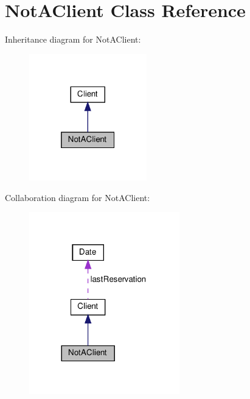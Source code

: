 \hypertarget{class_not_a_client}{}\section{Not\+A\+Client Class Reference}
\label{class_not_a_client}


Inheritance diagram for Not\+A\+Client\+:\nopagebreak
\begin{figure}[H]
\begin{center}
\leavevmode
\includegraphics[width=145pt]{class_not_a_client__inherit__graph}
\end{center}
\end{figure}


Collaboration diagram for Not\+A\+Client\+:\nopagebreak
\begin{figure}[H]
\begin{center}
\leavevmode
\includegraphics[width=185pt]{class_not_a_client__coll__graph}
\end{center}
\end{figure}

